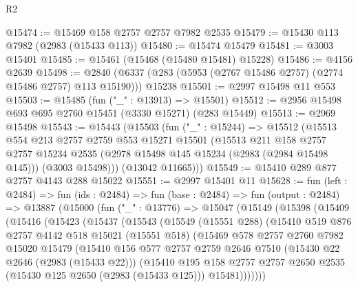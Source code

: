 \begin{lexlean}{R2}
\begin{coremodule}
@15474 := @15469 @158 @2757 @2757 @7982 @2535
@15479 := @15430 @113 @7982 (@2983 (@15433 @113))
@15480 := @15474 @15479
@15481 := @3003 @15401
@15485 := @15461 (@15468 (@15480 @15481) @15228)
@15486 := @4156 @2639
@15498 := @2840 (@6337 (@283 (@5953 (@2767 @15486 @2757) (@2774 @15486 @2757) @113 @15190))) @15238
@15501 := @2997 @15498 @11 @553
@15503 := @15485 (fun ("_" : @13913) => @15501)
@15512 := @2956 @15498 @693 @695 @2760 @15451 (@3330 @15271) (@283 @15449)
@15513 := @2969 @15498
@15543 := @15443
    (@15503
      (fun ("_" : @15244) =>
      @15512
        (@15513
          @554
          @213
          @2757
          @2759
          @553
          @15271
          @15501
          (@15513
            @211
            @158
            @2757
            @2757
            @15234
            @2535
            (@2978 @15498 @145 @15234 (@2983 (@2984 @15498 @145)))
            (@3003 @15498)))
        (@13042 @11665)))
@15549 := @15410 @289 @877 @2757 @4143 @288 @15022
@15551 := @2997 @15401 @11
@15628 := fun (left : @2484) =>
  fun (ids : @2484) =>
  fun (base : @2484) =>
  fun (output : @2484) =>
  @13887
    (@15000
      (fun ("_" : @13776) =>
      @15047
        (@15149
          (@15398
            (@15409
              (@15416
                (@15423
                  (@15437
                    (@15543
                      (@15549
                        (@15551 @288)
                        (@15410
                          @519
                          @876
                          @2757
                          @4142
                          @518
                          @15021
                          (@15551 @518)
                          (@15469
                            @578
                            @2757
                            @2760
                            @7982
                            @15020
                            @15479
                            (@15410
                              @156
                              @577
                              @2757
                              @2759
                              @2646
                              @7510
                              (@15430 @22 @2646 (@2983 (@15433 @22)))
                              (@15410
                                @195
                                @158
                                @2757
                                @2757
                                @2650
                                @2535
                                (@15430 @125 @2650 (@2983 (@15433 @125)))
                                @15481)))))))

\end{coremodule}
\end{lexlean}
